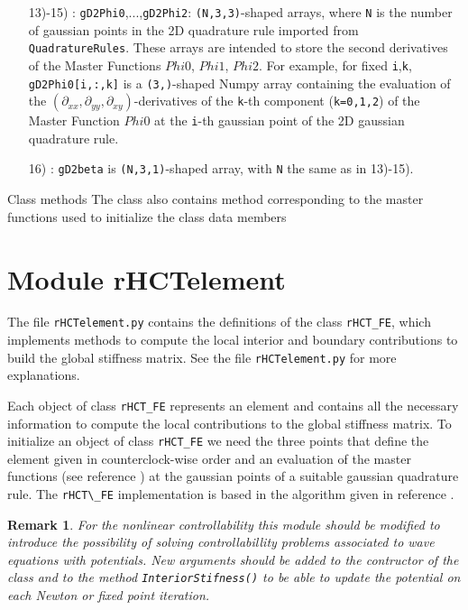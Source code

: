 \documentclass{amsart}
\theoremstyle{plain}
\newtheorem{remark}{Remark}
\theoremstyle{definition}
\theoremstyle{remark}
\numberwithin{equation}{section}
\begin{document}
\begin{itemize}
\item[13)-15)]: \verb|gD2Phi0|,...,\verb|gD2Phi2|: \verb|(N,3,3)|-shaped arrays, where \verb|N| is
the number of gaussian points in the 2D quadrature rule imported from \verb|QuadratureRules|. These arrays are intended to store the second derivatives of the Master Functions $Phi0$, $Phi1$, $Phi2$.
For example, for fixed \verb|i|,\verb|k|,  \verb|gD2Phi0[i,:,k]| is a \verb|(3,)|-shaped Numpy array containing the evaluation of the $(\partial_{xx},\partial_{yy},\partial_{xy})$-derivatives of the \verb|k|-th component (\verb|k=0,1,2|) of the Master Function $Phi0$ at the \verb|i|-th gaussian point of the 2D gaussian quadrature rule.
\item[16)]: \verb|gD2beta|  is \verb|(N,3,1)|-shaped array, with \verb|N| the same as in 13)-15).

\end{itemize}




 Class methods
The class also contains method corresponding to the master functions  used
to initialize the class data members

\section{Module rHCTelement}

The file \verb|rHCTelement.py| contains the definitions of the class \verb|rHCT_FE|, which implements
methods to compute the local interior and boundary contributions to build the global
stiffness matrix. See the file \verb|rHCTelement.py| for more explanations.

Each object of class \verb|rHCT_FE| represents an element and contains all the necessary
information to compute the local contributions to the global stiffness matrix.
To initialize an object of class \verb|rHCT_FE| we need the three points that define the element
given in counterclock-wise order and an evaluation of the master functions
(see reference \cite{Meyer}) at the gaussian points of a suitable gaussian quadrature rule.
The \verb|rHCT\_FE| implementation is based in the algorithm given in reference \cite{Meyer}.

\begin{remark}
For the nonlinear controllability this module should be modified to introduce the
possibility of solving controllabillity problems associated to wave equations with
potentials. New arguments should be added to the contructor of the class and to the
method \verb|InteriorStifness()| to be able to update the potential on each Newton or fixed
point iteration.
\end{remark}
\end{document}
